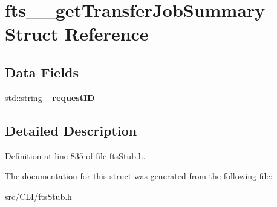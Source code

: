 \section{fts\_\-\_\-getTransferJobSummary Struct Reference}
\label{structfts____getTransferJobSummary}
\subsection*{Data Fields}
\begin{DoxyCompactItemize}
\item 
std::string {\bfseries \_\-requestID}\label{structfts____getTransferJobSummary_a1e62afb854c3dc467e01e7baab3f9e51}

\end{DoxyCompactItemize}


\subsection{Detailed Description}


Definition at line 835 of file ftsStub.h.



The documentation for this struct was generated from the following file:\begin{DoxyCompactItemize}
\item 
src/CLI/ftsStub.h\end{DoxyCompactItemize}
